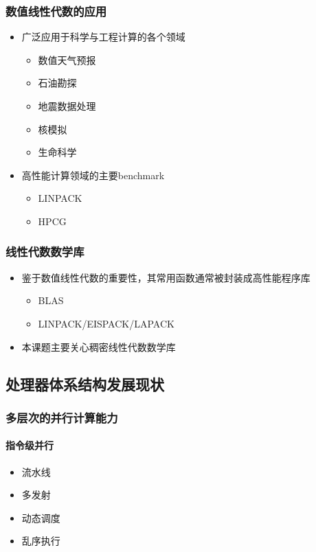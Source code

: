 \documentclass[aspectratio=169]{beamer}
\begin{document}
\begin{frame}
  \frametitle{数值线性代数的应用}
  \begin{itemize}
  \item 广泛应用于科学与工程计算的各个领域
    \begin{itemize}
    \item 数值天气预报
    \item 石油勘探
    \item 地震数据处理
    \item 核模拟
    \item 生命科学
    \end{itemize}
  \item 高性能计算领域的主要benchmark
    \begin{itemize}
    \item LINPACK
    \item HPCG
    \end{itemize}
  \end{itemize}
\end{frame}

\begin{frame}
  \frametitle{线性代数数学库}
  \begin{itemize}
  \item 鉴于数值线性代数的重要性，其常用函数通常被封装成高性能程序库
    \begin{itemize}
    \item BLAS
    \item LINPACK/EISPACK/LAPACK
    \end{itemize}
  \item 本课题主要关心稠密线性代数数学库
  \end{itemize}
\end{frame}

\subsection[体系结构]{处理器体系结构发展现状}

\begin{frame}
  \frametitle{多层次的并行计算能力}
  \framesubtitle{指令级并行}
  \begin{itemize}
  \item 流水线
  \item 多发射
  \item 动态调度
  \item 乱序执行
  \end{itemize}
\end{frame}
\end{document}
